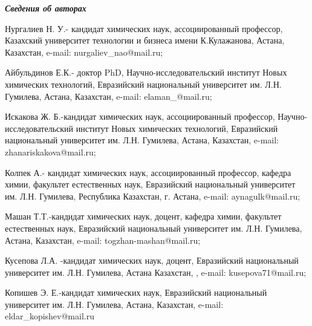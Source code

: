 \emph{{\bfseries Сведения об авторах}}

Нургалиев Н. У.- кандидат химических наук, ассоциированный профессор,
Казахский университет технологии и бизнеса имени К.Кулажанова, Астана,
Казахстан, e-mail: nurgaliev\_nao@mail.ru;

Айбульдинов Е.К.- доктор PhD, Научно-исследовательский институт Новых
химических технологий, Евразийский национальный университет им. Л.Н.
Гумилева, Астана, Казахстан, e-mail: elaman\_@mail.ru;

Искакова Ж. Б.-кандидат химических наук, ассоциированный профессор,
Научно-исследовательский институт Новых химических технологий,
Евразийский национальный университет им. Л.Н. Гумилева, Астана,
Казахстан, e-mail: zhanariskakova@mail.ru;

Колпек А.- кандидат химических наук, ассоциированный профессор, кафедра
химии, факультет естественных наук, Евразийский национальный университет
им. Л.Н. Гумилева, Республика Казахстан, г. Астана, e-mail:
aynagulk@mail.ru;

Машан Т.Т.-кандидат химических наук, доцент, кафедра химии, факультет
естественных наук, Евразийский национальный университет им. Л.Н.
Гумилева, Астана, Казахстан, e-mail: togzhan-mashan@mail.ru;

Кусепова Л.А. -кандидат химических наук, доцент, Евразийский
национальный университет им. Л.Н. Гумилева, Астана Казахстан, , e-mail:
kusepova71@mail.ru;

Копишев Э. Е.-кандидат химических наук, Евразийский национальный
университет им. Л.Н. Гумилева, Астана, Казахстан, e-mail:
eldar\_kopishev@mail.ru
